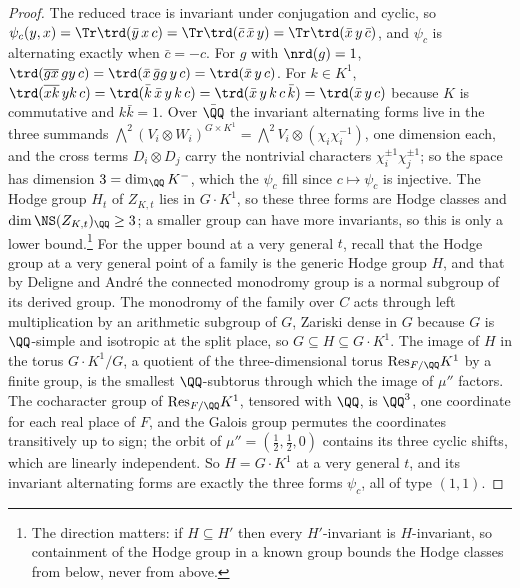 \begin{proof}
The reduced trace is invariant under conjugation and cyclic, so $\psi_{c}(y,x)=\Tr\trd(\bar y\,x\,c)=\Tr\trd(\bar c\,\bar x\,y)=\Tr\trd(\bar x\,y\,\bar c)$, and $\psi_{c}$ is alternating exactly when $\bar c=-c$. For $g$ with $\nrd(g)=1$, $\trd(\overline{gx}\,gy\,c)=\trd(\bar x\,\bar g g\,y\,c)=\trd(\bar x\,y\,c)$. For $k\in K^{1}$, $\trd(\overline{xk}\,yk\,c)=\trd(\bar k\,\bar x\,y\,k\,c)=\trd(\bar x\,y\,k\,c\,\bar k)=\trd(\bar x\,y\,c)$ because $K$ is commutative and $k\bar k=1$. Over $\bar\QQ$ the invariant alternating forms live in the three summands $\bigwedge^{2}(V_{i}\otimes W_{i})^{G\times K^{1}}=\bigwedge^{2}V_{i}\otimes(\chi_{i}\chi_{i}^{-1})$, one dimension each, and the cross terms $D_{i}\otimes D_{j}$ carry the nontrivial characters $\chi_{i}^{\pm1}\chi_{j}^{\pm1}$; so the space has dimension $3=\dim_{\QQ}K^{-}$, which the $\psi_{c}$ fill since $c\mapsto\psi_{c}$ is injective. The Hodge group $H_{t}$ of $Z_{K,t}$ lies in $G\cdot K^{1}$, so these three forms are Hodge classes and $\dim\NS(Z_{K,t})_{\QQ}\ge3$; a smaller group can have more invariants, so this is only a lower bound.\footnote{The direction matters: if $H\subseteq H'$ then every $H'$-invariant is $H$-invariant, so containment of the Hodge group in a known group bounds the Hodge classes from below, never from above.} For the upper bound at a very general $t$, recall that the Hodge group at a very general point of a family is the generic Hodge group $H$, and that by Deligne and Andr\'e \cite{And92} the connected monodromy group is a normal subgroup of its derived group. The monodromy of the family over $C$ acts through left multiplication by an arithmetic subgroup of $G$, Zariski dense in $G$ because $G$ is $\QQ$-simple and isotropic at the split place, so $G\subseteq H\subseteq G\cdot K^{1}$. The image of $H$ in the torus $G\cdot K^{1}/G$, a quotient of the three-dimensional torus $\mathrm{Res}_{F/\QQ}K^{1}$ by a finite group, is the smallest $\QQ$-subtorus through which the image of $\mu''$ factors. The cocharacter group of $\mathrm{Res}_{F/\QQ}K^{1}$, tensored with $\QQ$, is $\QQ^{3}$, one coordinate for each real place of $F$, and the Galois group permutes the coordinates transitively up to sign; the orbit of $\mu''=(\tfrac12,\tfrac12,0)$ contains its three cyclic shifts, which are linearly independent. So $H=G\cdot K^{1}$ at a very general $t$, and its invariant alternating forms are exactly the three forms $\psi_{c}$, all of type $(1,1)$.
\end{proof}

